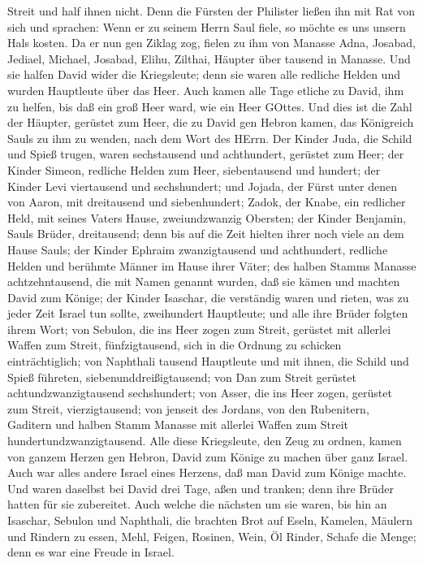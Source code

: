 Streit und half ihnen nicht. Denn die Fürsten der Philister ließen ihn
mit Rat von sich und sprachen: Wenn er zu seinem Herrn Saul fiele, so
möchte es uns unsern Hals kosten.  Da er nun gen Ziklag
zog, fielen zu ihm von Manasse Adna, Josabad, Jediael, Michael, Josabad,
Elihu, Zilthai, Häupter über tausend in Manasse.  Und sie
halfen David wider die Kriegsleute; denn sie waren alle redliche Helden
und wurden Hauptleute über das Heer.  Auch kamen alle Tage
etliche zu David, ihm zu helfen, bis daß ein groß Heer ward, wie ein
Heer GOttes.  Und dies ist die Zahl der Häupter, gerüstet
zum Heer, die zu David gen Hebron kamen, das Königreich Sauls zu ihm zu
wenden, nach dem Wort des HErrn.  Der Kinder Juda, die
Schild und Spieß trugen, waren sechstausend und achthundert, gerüstet
zum Heer;  der Kinder Simeon, redliche Helden zum Heer,
siebentausend und hundert;  der Kinder Levi viertausend und
sechshundert;  und Jojada, der Fürst unter denen von Aaron,
mit dreitausend und siebenhundert;  Zadok, der Knabe, ein
redlicher Held, mit seines Vaters Hause, zweiundzwanzig Obersten;
 der Kinder Benjamin, Sauls Brüder, dreitausend; denn bis
auf die Zeit hielten ihrer noch viele an dem Hause Sauls; 
der Kinder Ephraim zwanzigtausend und achthundert, redliche Helden und
berühmte Männer im Hause ihrer Väter;  des halben Stamms
Manasse achtzehntausend, die mit Namen genannt wurden, daß sie kämen und
machten David zum Könige;  der Kinder Isaschar, die
verständig waren und rieten, was zu jeder Zeit Israel tun sollte,
zweihundert Hauptleute; und alle ihre Brüder folgten ihrem Wort;
 von Sebulon, die ins Heer zogen zum Streit, gerüstet mit
allerlei Waffen zum Streit, fünfzigtausend, sich in die Ordnung zu
schicken einträchtiglich;  von Naphthali tausend Hauptleute
und mit ihnen, die Schild und Spieß führeten, siebenunddreißigtausend;
 von Dan zum Streit gerüstet achtundzwanzigtausend
sechshundert;  von Asser, die ins Heer zogen, gerüstet zum
Streit, vierzigtausend;  von jenseit des Jordans, von den
Rubenitern, Gaditern und halben Stamm Manasse mit allerlei Waffen zum
Streit hundertundzwanzigtausend.  Alle diese Kriegsleute,
den Zeug zu ordnen, kamen von ganzem Herzen gen Hebron, David zum Könige
zu machen über ganz Israel. Auch war alles andere Israel eines Herzens,
daß man David zum Könige machte.  Und waren daselbst bei
David drei Tage, aßen und tranken; denn ihre Brüder hatten für sie
zubereitet.  Auch welche die nächsten um sie waren, bis hin
an Isaschar, Sebulon und Naphthali, die brachten Brot auf Eseln,
Kamelen, Mäulern und Rindern zu essen, Mehl, Feigen, Rosinen, Wein, Öl
Rinder, Schafe die Menge; denn es war eine Freude in Israel.

